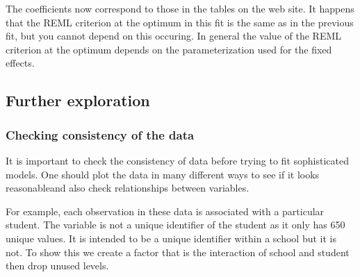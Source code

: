 \documentclass[12pt]{article}
\begin{document}
The coefficients now correspond to those in the tables on the web
site.  It happens that the REML criterion at the optimum in this fit
is the same as in the previous fit, but you cannot depend on this
occuring.  In general the value of the REML criterion at the optimum
depends on the parameterization used for the fixed effects.

\subsection{Further exploration}
\label{sec:ExamExplore}


\subsubsection{Checking consistency of the data}
\label{sec:consistency}

It is important to check the consistency of data before trying to fit
sophisticated models.  One should plot the data in many different ways
to see if it looks reasonableand also check relationships between
variables.  

For example, each observation in these data is associated with a
particular student.  The variable  is not a unique
identifier of the student as it only has 650 unique values.  It is
intended to be a unique identifier within a school but it is not.  To
show this we create a factor that is the interaction of school and
student then drop unused levels.

\begin{Schunk}
\end{Schunk}
\end{document}
